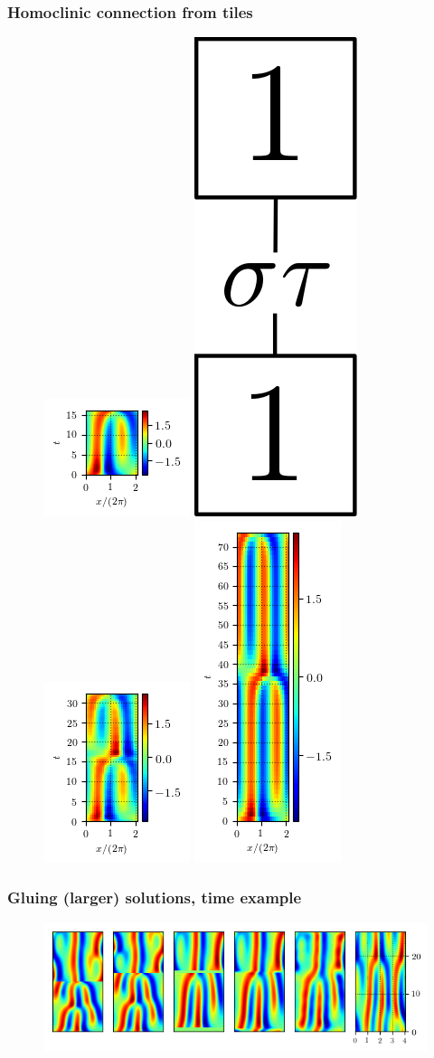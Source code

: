 \documentclass[mathserif, handout]{beamer}
\begin{document}
\begin{frame}%
  \frametitle{Homoclinic connection from tiles}
  \begin{figure}
  \includegraphics[width=.22\textwidth]{MNG_half_final}
  \includegraphics[width=.1\textwidth,height=.25\textheight]{MNG11symb}
  \includegraphics[width=.22\textwidth]{MNG11init}
  \includegraphics[width=.22\textwidth]{MNG11final}
  \end{figure}
\end{frame}

\begin{frame}%
  \frametitle{Gluing (larger) solutions, time example}
  \begin{figure}
  \includegraphics[width=.9\textwidth]{MNG_ppo1ppo2_time}
  \end{figure}
\end{frame}
\end{document}
